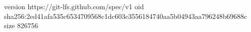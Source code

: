 version https://git-lfs.github.com/spec/v1
oid sha256:2ed41afa535c6534709568c1dc603c3556184740aa5b04943aa796248b69688c
size 826756
